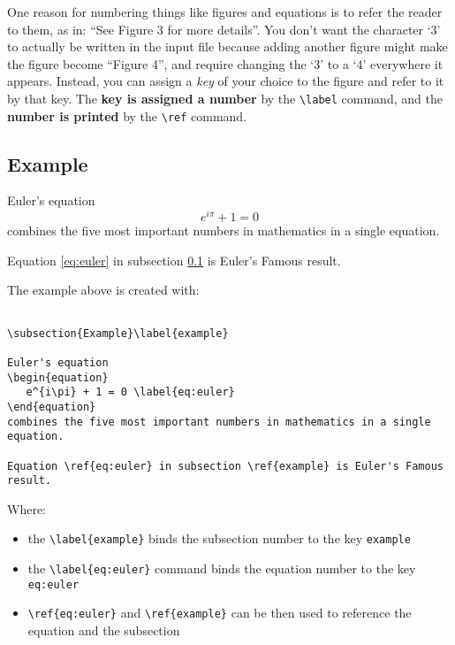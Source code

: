 \documentclass{article}
\begin{document}
One reason for numbering things like figures and equations is to refer the reader to them, as in:
``See Figure 3 for more details''. You don't want the character `3' to actually be written in the
input file because adding another figure might make the figure become ``Figure 4'', and require
changing the `3' to a `4' everywhere it appears. Instead, you can assign a \emph{key} of your
choice to the figure and refer to it by that key. 
The \textbf{key is assigned a number} by the \verb:\label: command, and 
the \textbf{number is printed} by the \verb:\ref: command.

\subsection{Example}\label{example}

Euler's equation
\begin{equation}
   e^{i\pi} + 1 = 0 \label{eq:euler}
\end{equation}
combines the five most important numbers in mathematics in a single equation.

Equation \ref{eq:euler} in subsection \ref{example} is Euler's Famous result. \newline

The example above is created with: 
\begin{lstlisting}[language={[LaTeX]TeX}]

\subsection{Example}\label{example}

Euler's equation
\begin{equation}
   e^{i\pi} + 1 = 0 \label{eq:euler}
\end{equation}
combines the five most important numbers in mathematics in a single equation.

Equation \ref{eq:euler} in subsection \ref{example} is Euler's Famous result.

\end{lstlisting}

Where:
\begin{itemize}
   \item the \verb:\label{example}: binds the subsection number to the key
    {\tt example}
    
   \item the \verb-\label{eq:euler}- command binds the equation number to the key
    {\tt eq:euler} 
    
   \item \verb-\ref{eq:euler}- and \verb:\ref{example}: can be then used to reference the
    equation and the subsection
\end{itemize}
\end{document}
